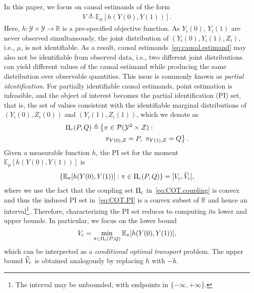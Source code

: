 \documentclass{article}
\theoremstyle{plain}
\theoremstyle{definition}
\def\PP{P}
\def\QQ{Q}
\def\calY{\mathcal{Y}}
\def\calZ{\mathcal{Z}}
\newcommand{\cc}{\textup{c}}
\newcommand{\Let}{\triangleq}
\theoremstyle{plain}
\def\calY{\mathcal{Y}}
\def\calZ{\mathcal{Z}}
\renewcommand{\Let}{\triangleq}
\begin{document}
In this paper, we focus on causal estimands of the form 
\begin{align}\label{eq:causal.estimand}
    V \Let \mathbb{E}_{\mu}[h(Y(0), Y(1))].
\end{align} 
Here, \( h: \calY \times \calY \rightarrow \mathbb{R} \) is a pre-specified objective function.
As $Y_i(0)$, $Y_i(1)$ are never observed simultaneously, the joint distribution of \( (Y_i(0), Y_i(1), Z_i) \), i.e., $\mu$, is not identifiable.
As a result, causal estimands~\eqref{eq:causal.estimand}  may also not be identifiable from observed data, i.e., two different joint distributions can yield different values of the causal estimand while producing the same distribution over observable quantities.
This issue is commonly known as \textit{partial identification}.
For partially identifiable causal estimands, point estimation is infeasible, and the object of interest becomes the partial identification (PI) set, that is, the set of values consistent with the identifiable marginal distributions of \( (Y_i(0), Z_i(0))\) and \( (Y_i(1), Z_i(1)) \), which we denote as 
\begin{align}\label{eq:COT.coupling}
\begin{split}
    \Pi_{\cc}(\PP, \QQ) \Let &\left\{ \pi \in \mathcal{P}(\calY^2 \times \calZ): \right.\\
&~~ \left.\pi_{Y(0), Z} = \PP, \ \pi_{Y(1), Z} = \QQ \right\}.
\end{split}
\end{align}
Given a measurable function $h$, the PI set for the moment $\mathbb{E}_{\mu}[h(Y(0), Y(1))]$ is
\begin{align}\label{eq:COT.PI}
    \left\{ \mathbb{E}_\pi[h(Y(0), Y(1))] : \pi \in \Pi_{\cc}(\PP, \QQ)  \right\}
    = [V_{\cc}, \widetilde V_{\cc}],
\end{align}
where we use the fact that the coupling set $\Pi_{\cc}$ in~\eqref{eq:COT.coupling} is convex and thus the induced PI set in~\eqref{eq:COT.PI} is a convex subset of $\mathbb{R}$ and hence an interval\footnote{The interval may be unbounded, with endpoints in $\{-\infty,+\infty\}$.}. Therefore, characterizing the PI set reduces to computing its lower and upper bounds.
In particular, we focus on the lower bound
\begin{align}\label{eq:COT.lower}
    V_{\cc}
    = \min_{\pi \in \Pi_{\cc}(\PP, \QQ) } \mathbb{E}_\pi[h(Y(0), Y(1))],
\end{align}
which can be interpreted as a \textit{conditional optimal transport} problem. The upper bound $\widetilde V_{\cc}$ is obtained analogously by replacing $h$ with $-h$.
\end{document}

